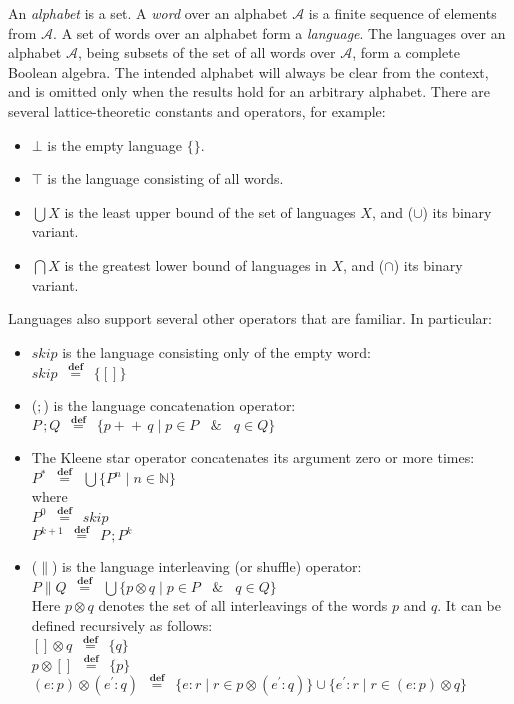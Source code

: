 \documentclass[a4paper,leqno]{llncs}
\newcommand{\spacedwith}[2]{\ensuremath{\phantom{#2}#1\phantom{#2}}}
\newcommand{\spaced}[1]{\spacedwith{#1}{m}}
\newcommand{\defn}{\spacedwith{\stackrel{\mathbf{def}}{=}}{o}}
\newcommand{\askip}{\ensuremath{\textit{skip}}}
\newcommand{\abottom}{\ensuremath{\bot}}
\newcommand{\atopp}{\ensuremath{\top}}
\newcommand{\asemicolon}{\ensuremath{\,;}}
\newcommand{\asemicolontext}{\ensuremath{;}}
\newcommand{\aor}{\ensuremath{\cup}}
\newcommand{\aand}{\ensuremath{\cap}}
\newcommand{\aunion}{\aor}
\newcommand{\aintersect}{\aand}
\newcommand{\alub}{\ensuremath{\bigcup}}
\newcommand{\aglb}{\ensuremath{\bigcap}}
\newcommand{\astar}{\ensuremath{\parallel}}
\newcommand{\kleene}[1]{\ensuremath{{#1}^*}}
\newcommand{\sand}{\spaced{\&}}
\newcommand{\append}[2]{\ensuremath{{#1}+\!\!\!+\,{#2}}}
\newcommand{\interleave}[2]{\ensuremath{{#1}\otimes{#2}}}
\begin{document}
An \emph{alphabet} is a set. A \emph{word} over an alphabet $\mathcal{A}$ is a finite sequence of elements from $\mathcal{A}$. A set of words over an alphabet form a \emph{language}. The languages over an alphabet $\mathcal{A}$, being subsets of the set of all words over $\mathcal{A}$, form a complete Boolean algebra. The intended alphabet will always be clear from the context, and is omitted only when the results hold for an arbitrary alphabet. There are several lattice-theoretic constants and operators, for example:
\begin{itemize}
 \item \abottom{} is the empty language $\{\}$.
 \item \atopp{} is the language consisting of all words.
 \item $\alub X$ is the least upper bound of the set of languages $X$, and (\aunion) its binary variant.
 \item $\aglb X$ is the greatest lower bound of languages in $X$, and (\aintersect) its binary variant.
\end{itemize}
Languages also support several other operators that are familiar. In particular:
\begin{itemize}
 \item \askip{} is the language consisting only of the empty word: \\
       $\askip \defn \{[]\}$
 \item (\asemicolontext) is the language concatenation operator: \\
       $P \asemicolon Q \defn \{\append{p}{q} \mid p \in P \sand q \in Q \}$
 \item The Kleene star operator concatenates its argument zero or more times: \\
       $\kleene{P} \defn \alub\{P^n \mid n \in \mathbb{N}\}$ \\
       where \\
       $P^0 \defn \askip$ \\
       $P^{k+1} \defn P \asemicolon P^k$
 \item (\astar) is the language interleaving (or shuffle) operator: \\
       $P \astar Q \defn \alub\{\interleave{p}{q} \mid p \in P \sand q \in Q \}$ \\
       Here \interleave{p}{q} denotes the set of all interleavings of the words $p$ and $q$. It can be defined recursively as follows: \\
       $\interleave{[]}{q} \defn \{q\}$ \\
       $\interleave{p}{[]} \defn \{p\}$ \\
       $\interleave{(e:p)}{(e^\prime:q)} \defn \{e:r \mid r \in \interleave{p}{(e^\prime:q)}\} \cup \{e^\prime:r \mid r \in \interleave{(e:p)}{q}\}$ \\
\end{itemize}
\end{document}

